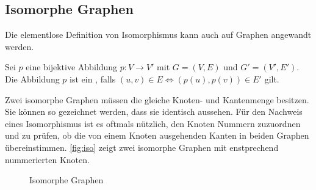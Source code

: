 \subsection{Isomorphe Graphen}
Die elementlose Definition von Isomorphismus kann auch auf Graphen angewandt werden.
\begin{df} Sei $p$ eine bijektive Abbildung $p : V \rightarrow V'$ mit $G = (V,E)$ und $G' = (V',E')$. Die Abbildung $p$ ist ein , falls $(u, v) \in E \Leftrightarrow (p(u), p(v)) \in E'$ gilt.
\end{df}
Zwei isomorphe Graphen müssen die gleiche Knoten- und Kantenmenge besitzen. Sie können so gezeichnet werden, dass sie identisch aussehen. Für den Nachweis eines Isomorphismus ist es oftmals nützlich, den Knoten Nummern zuzuordnen und zu prüfen, ob die von einem Knoten ausgehenden Kanten in beiden Graphen übereinstimmen. \autoref{fig:iso} zeigt zwei isomorphe Graphen mit enstprechend nummerierten Knoten.
\begin{figure}
\centering
{}
\caption{Isomorphe Graphen}\label{fig:iso}
\end{figure}
